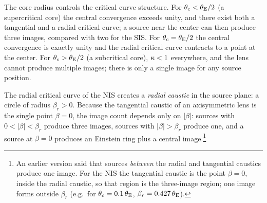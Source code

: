 The core radius controls the critical curve structure.  For
$\theta_c < \theta_{\mathrm{E}}/2$ (a supercritical core) the central convergence
exceeds unity, and there exist both a tangential and a radial
critical curve; a source near the center can then produce three
images, compared with two for the SIS\@.  For $\theta_c = \theta_{\mathrm{E}}/2$
the central convergence is exactly unity and the radial critical curve
contracts to a point at the center.  For $\theta_c > \theta_{\mathrm{E}}/2$ (a
subcritical core), $\kappa < 1$ everywhere, and the lens cannot
produce multiple images; there is only a single image for any source
position.

The radial critical curve of the NIS creates a \emph{radial
caustic} in the source plane: a circle of radius $\beta_r > 0$.
Because the tangential caustic of an axisymmetric lens is the single
point $\beta = 0$, the image count depends only on $|\beta|$: sources
with $0 < |\beta| < \beta_r$ produce three images, sources with
$|\beta| > \beta_r$ produce one, and a source at $\beta = 0$ produces an
Einstein ring plus a central image.\footnote{An earlier version said that
sources \emph{between} the radial and tangential caustics produce one image.
For the NIS the tangential caustic is the point $\beta=0$, inside the radial
caustic, so that region is the three-image region; one image forms outside
$\beta_r$ (e.g.\ for $\theta_c = 0.1\,\theta_{\mathrm{E}}$, $\beta_r = 0.427\,\theta_{\mathrm{E}}$).}

